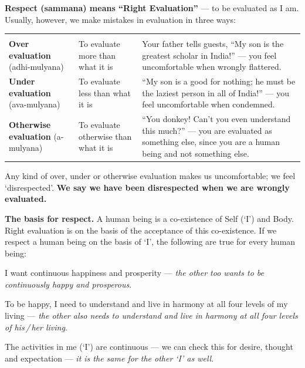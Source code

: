 
\ans \textbf{Respect (sammana) means ``Right Evaluation''} --- to be evaluated
as I am. Usually, however, we make mistakes in evaluation in three ways:

\renewcommand{\arraystretch}{1.3}
\begin{longtable}{P{45mm} P{40mm} P{62mm}}
 &  &  \\ \hline
\endfirsthead
{} &  &  \\ \hline
\endhead
\textbf{Over evaluation} (adhi-mulyana) & To evaluate more than what it is &
  Your father tells guests, ``My son is the greatest scholar in India!'' ---
  you feel uncomfortable when wrongly flattered. \\ \hline
\textbf{Under evaluation} (ava-mulyana) & To evaluate less than what it is &
  ``My son is a good for nothing; he must be the laziest person in all of
  India!'' --- you feel uncomfortable when condemned. \\ \hline
\textbf{Otherwise evaluation} (a-mulyana) & To evaluate otherwise than what it
  is & ``You donkey! Can't you even understand this much?'' --- you are
  evaluated as something else, since you are a human being and not something
  else. \\ \hline
\end{longtable}

Any kind of over, under or otherwise evaluation makes us uncomfortable; we
feel `disrespected'. \textbf{We say we have been disrespected when we are
wrongly evaluated.}

\textbf{The basis for respect.} A human being is a co-existence of Self (`I')
and Body. Right evaluation is on the basis of the acceptance of this
co-existence. If we respect a human being on the basis of `I', the following
are true for every human being:

\begin{apts}
\item I want continuous happiness and prosperity --- \emph{the other too wants
      to be continuously happy and prosperous}.
\item To be happy, I need to understand and live in harmony at all four levels
      of my living --- \emph{the other also needs to understand and live in
      harmony at all four levels of his\,/\,her living}.
\item The activities in me (`I') are continuous --- we can check this for
      desire, thought and expectation --- \emph{it is the same for the other
      `I' as well}.
\end{apts}

